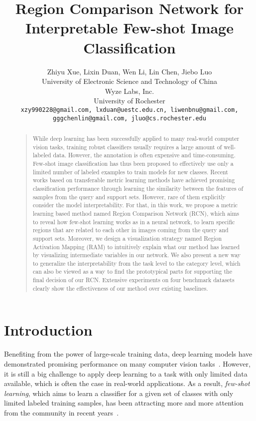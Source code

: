 \documentclass[letterpaper]{article}
\begin{document}
\title{Region Comparison Network for Interpretable Few-shot Image Classification}
\author{Zhiyu Xue, Lixin Duan, Wen Li, Lin Chen, Jiebo Luo\\
University of Electronic Science and Technology of China\\
Wyze Labs, Inc. \\
University of Rochester\\
{\tt\small xzy990228@gmail.com, lxduan@uestc.edu.cn,
liwenbnu@gmail.com,}\\
{\tt\small gggchenlin@gmail.com, jluo@cs.rochester.edu}
}
\maketitle
\begin{abstract}
\begin{quote}
While deep learning has been successfully applied to many real-world computer vision tasks, training robust classifiers usually requires a large amount of well-labeled data. However, the annotation is often expensive and time-consuming. Few-shot image classification has thus been proposed to effectively use only a limited number of labeled examples to train models for new classes. Recent works based on transferable metric learning methods have achieved promising classification performance through learning the similarity between the features of samples from the query and support sets. However, rare of them explicitly consider the model interpretability. For that, in this work, we propose a metric learning based method named Region Comparison Network (RCN), which aims to reveal how few-shot learning works as in a neural network, to learn specific regions that are related to each other in images coming from the query and support sets. Moreover, we design a visualization strategy named Region Activation Mapping (RAM) to intuitively explain what our method has learned by visualizing intermediate variables in our network. We also present a new way to generalize the interpretability from the task level to the category level, which can also be viewed as a way to find the prototypical parts for supporting the final decision of our RCN. Extensive experiments on four benchmark datasets clearly show the effectiveness of our method over existing baselines.
\end{quote}
\end{abstract}

\section{Introduction}
Benefiting from the power of large-scale training data, deep learning models have demonstrated promising performance on many computer vision tasks~\cite{huang2017densely,He2016Deep,szegedy2017inception,Krizhevsky2012Alex,HuSqueeze}. However, it is still a big challenge to apply deep learning to a task with only limited data available, which is often the case in real-world applications. 
As a result, \emph{few-shot learning}, which aims to learn a classifier for a given set of classes with only limited labeled training samples, has been attracting more and more attention from the community in recent years~\cite{huang2019compare,LiMeta,kim2019egnn}.
\end{document}
